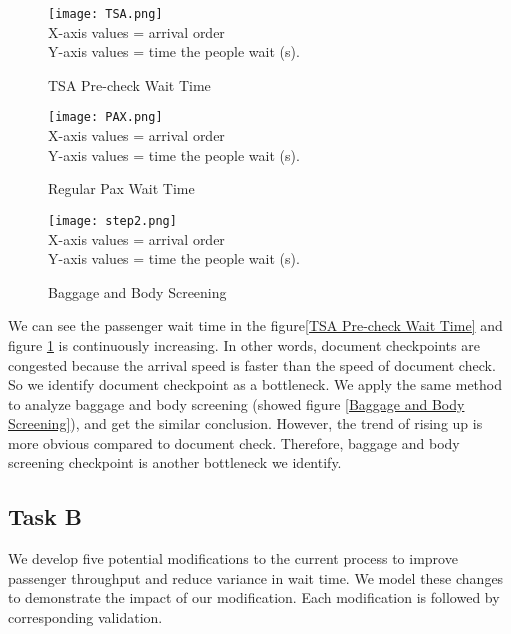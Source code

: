 \documentclass{mcmthesis}
\begin{document}
\begin{figure}[htbp]  
\begin{minipage}[t]{0.5\textwidth}
\centering  
\texttt{[image: TSA.png]} \\
X-axis values = arrival order\\
Y-axis values = time the people wait (s).
\caption{TSA Pre-check Wait Time} \label{TSA Pre-check Wait Time}
\end{minipage}
\hspace{1ex}
\begin{minipage}[t]{0.5\textwidth}  
\centering  
\texttt{[image: PAX.png]}\\
X-axis values = arrival order\\
Y-axis values = time the people wait (s).
\caption{Regular Pax Wait Time}  \label{Regular Pax Wait Time}
\end{minipage}  
\end{figure} 


\begin{figure}[h]
\small
\centering
\texttt{[image: step2.png]}\\
X-axis values = arrival order\\
Y-axis values = time the people wait (s).
\caption{Baggage and Body Screening} \label{fig:Baggage and Body Screening}
\end{figure}

\par We can see the passenger wait time in the figure\ref{TSA Pre-check Wait Time} and figure \ref{Regular Pax Wait Time} is continuously increasing. In other words, document checkpoints are congested because the arrival speed is faster than the speed of document check. So we identify document checkpoint as a bottleneck. We apply the same method to analyze baggage and body screening (showed figure \ref{Baggage and Body Screening}), and get the similar conclusion. However, the trend of rising up is more obvious compared to document check. Therefore, baggage and body screening checkpoint is another bottleneck we identify.

\subsection{Task B}
\par We develop five potential modifications to the current process to improve passenger throughput and reduce variance in wait time. We model these changes to demonstrate the impact of our modification. Each modification is followed by corresponding validation. 
\end{document}

